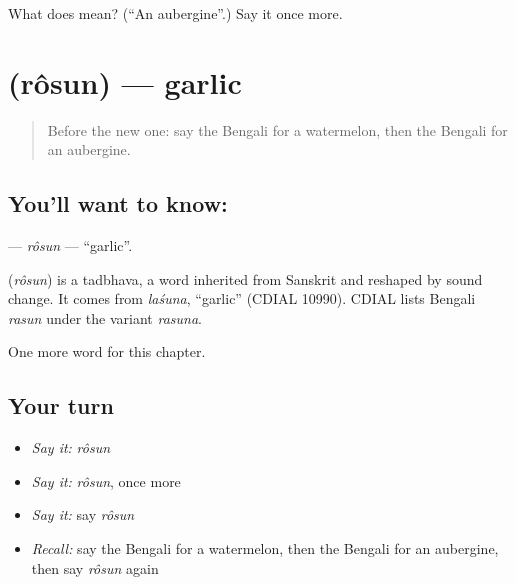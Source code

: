\begin{tcolorbox}[breakable,colback=teal!4,colframe=teal!35!black,title={Before you move on}]
What does  mean? (\textquotedblleft{}An aubergine\textquotedblright{}.) Say it once more.
\end{tcolorbox}
\section[\texorpdfstring{\bn{রসুন} (rôsun)}{রসুন (rôsun)}]{ (rôsun) — garlic}

\label{lesson:BN-C116-rosun}



\begin{quote}
Before the new one: say the Bengali for a watermelon, then the Bengali for an aubergine.
\end{quote}

\subsection*{You'll want to know: }
\textbf{} — \emph{rôsun} — \textquotedblleft{}garlic\textquotedblright{}.

\begin{cousinweb}
\textbf{} (\emph{rôsun}) is a tadbhava, a word inherited from Sanskrit and reshaped by sound change. It comes from \emph{laśuna}, \textquotedblleft{}garlic\textquotedblright{} (CDIAL 10990). CDIAL lists Bengali \emph{rasun} under the variant \emph{rasuna}.
\end{cousinweb}

\begin{grammarlens}[title={What you've built}]
One more word for this chapter.
\end{grammarlens}

\subsection*{Your turn}
\begin{itemize}
\raggedright
  \item \emph{Say it:} \emph{rôsun}
  \item \emph{Say it:} \emph{rôsun}, once more
  \item \emph{Say it:} say \emph{rôsun}
  \item \emph{Recall:} say the Bengali for a watermelon, then the Bengali for an aubergine, then say \emph{rôsun} again
\end{itemize}

